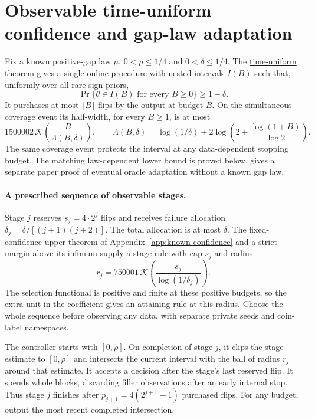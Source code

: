 \section{Observable time-uniform confidence and gap-law adaptation}
\label{app:anytime}

Fix a known positive-gap law $\mu$, $0<\rho\le1/4$ and
$0<\delta\le1/4$. The \href{https://github.com/davidiach/adaptive-threshold-estimation/blob/ffc0c5eb436ff31706d6f46fc135d1831b5a4e61/lean/ThresholdHC/Anytime/Full.lean}{time-uniform theorem} gives a single online procedure with nested intervals
$I(B)$ such that, uniformly over all rare sign priors,
\[
 \Pr\{\theta\in I(B)\text{ for every }B\ge0\}\ge1-\delta.
\]
It purchases at most $\lfloor B\rfloor$ flips by the output at budget $B$.
On the simultaneous-coverage event its half-width, for every $B\ge1$,
is at most
\[
 1500002\,\mathcal K\!\left(\frac{B}{\Lambda(B,\delta)}\right),\qquad
 \Lambda(B,\delta)=\log(1/\delta)+
 2\log\!\left(2+\frac{\log(1+B)}{\log2}\right).
\]
The same coverage event protects the interval at any data-dependent stopping
budget. The matching law-dependent lower bound is proved below.
 gives a separate paper proof of
eventual oracle adaptation without a known gap law.

\paragraph{A prescribed sequence of observable stages.}
Stage $j$ reserves $s_j=4\cdot2^j$ flips and receives failure allocation
$\delta_j=\delta/[(j+1)(j+2)]$. The total allocation is at most $\delta$.
The fixed-confidence upper theorem of Appendix~\ref{app:known-confidence}
and a strict margin above its infimum supply a stage rule with cap $s_j$
and radius
\[
 r_j=750001\,\mathcal K\!\left(\frac{s_j}{\log(1/\delta_j)}\right).
\]
The selection functional is positive and finite at these positive budgets,
so the extra unit in the coefficient gives an attaining rule at this radius.
Choose the whole sequence before observing any data, with separate private
seeds and coin-label namespaces.

The controller starts with $[0,\rho]$. On completion of stage $j$, it clips
the stage estimate to $[0,\rho]$ and intersects the current interval with
the ball of radius $r_j$ around that estimate. It accepts a decision after
the stage's last reserved flip. It spends whole blocks, discarding filler
observations after an early internal stop. Thus stage $j$ finishes after
$p_{j+1}=4(2^{j+1}-1)$ purchased flips. For any budget, output the most recent
completed intersection.


